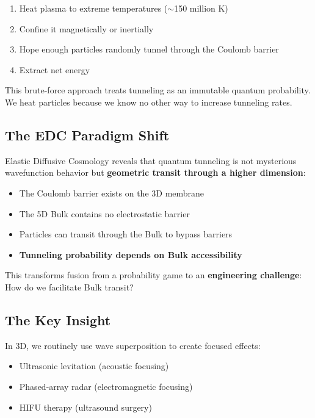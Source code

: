 \documentclass[12pt,a4paper]{article}
\begin{document}
\begin{enumerate}
    \item Heat plasma to extreme temperatures ($\sim$150 million K)
    \item Confine it magnetically or inertially
    \item Hope enough particles randomly tunnel through the Coulomb barrier
    \item Extract net energy
\end{enumerate}

This brute-force approach treats tunneling as an immutable quantum probability. We heat particles because we know no other way to increase tunneling rates.

\subsection{The EDC Paradigm Shift}

Elastic Diffusive Cosmology reveals that quantum tunneling is not mysterious wavefunction behavior but \textbf{geometric transit through a higher dimension}:

\begin{itemize}
    \item The Coulomb barrier exists on the 3D membrane
    \item The 5D Bulk contains no electrostatic barrier
    \item Particles can transit through the Bulk to bypass barriers
    \item \textbf{Tunneling probability depends on Bulk accessibility}
\end{itemize}

This transforms fusion from a probability game to an \textbf{engineering challenge}: How do we facilitate Bulk transit?

\subsection{The Key Insight}

In 3D, we routinely use wave superposition to create focused effects:
\begin{itemize}
    \item Ultrasonic levitation (acoustic focusing)
    \item Phased-array radar (electromagnetic focusing)
    \item HIFU therapy (ultrasound surgery)
\end{itemize}
\end{document}
